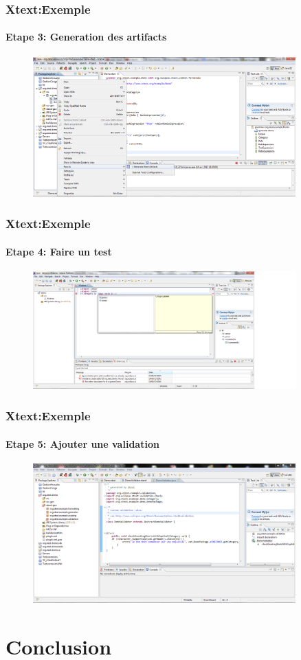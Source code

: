 \documentclass{beamer}
\begin{document}
	\begin{frame}
	\frametitle{Xtext:Exemple}\framesubtitle{Etape 3: Generation des artifacts}
	\begin{figure}[h]
	\centering
			\includegraphics[width=0.90\textwidth]{3.PNG}
	\label{fig:3}
\end{figure}

\end{frame} 
	\begin{frame}
	\frametitle{Xtext:Exemple}\framesubtitle{Etape 4: Faire un test}
	\begin{figure}[h]
	\centering
			\includegraphics[width=0.90\textwidth]{4.PNG}
	\label{fig:4}
\end{figure}

\end{frame} 	\begin{frame}
	\frametitle{Xtext:Exemple}\framesubtitle{Etape 5: Ajouter une validation}
	\begin{figure}[h]
	\centering
			\includegraphics[width=0.90\textwidth]{5.PNG}
	\label{fig:5}
\end{figure}

\end{frame} 



\section{Conclusion}
\end{document}
